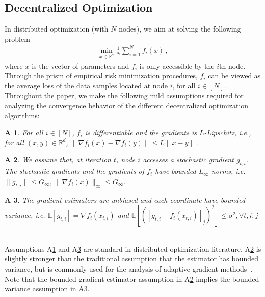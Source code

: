 \documentclass{article} %
\newtheorem{assumptionA}{A\!\!}
\begin{document}
\vspace{-0.05in}
\subsection{Decentralized Optimization }
\vspace{-0.05in}

In distributed optimization (with $N$ nodes), we aim at solving the following problem
\begin{align}\label{eq:minproblem}
\min_{x \in \mathbb{R}^d} \frac{1}{N}\sum_{i=1}^N f_i(x) \, ,
\end{align}
where $x$ is the vector of parameters and $f_i$ is only accessible by the $i$th node. 
Through the prism of empirical risk minimization procedures, $f_i$ can be viewed as the average loss of the data samples located at node $i$, for all $i \in [N]$. 
Throughout the paper, we make the following mild assumptions required for analyzing the convergence behavior of the different decentralized optimization algorithms:
\begin{assumptionA}\label{a:diff}
For all $i \in [N]$, $f_i$ is differentiable and the gradients is $L$-Lipschitz, i.e., for all $(x, y) \in \mathbb{R}^d$, $\|\nabla f_i(x) - \nabla f_i(y) \| \leq L\|x-y\|$.
\end{assumptionA}
\begin{assumptionA}\label{a:boundsto}
We assume that, at iteration $t$, node $i$ accesses a stochastic gradient $g_{t,i}$. The stochastic gradients and the gradients of $f_i$ have bounded $L_{\infty}$ norms, i.e. $\|g_{t,i}\| \leq G_{\infty}$, $\|\nabla f_i(x)\|_{\infty} \leq G_{\infty}$. 
\end{assumptionA}
\begin{assumptionA}\label{a:boundedvar}
The gradient estimators are unbiased and each coordinate have bounded variance, i.e. $\mathbb E [g_{t,i}] = \nabla f_i(x_{t,i}) $ and $\mathbb E [([g_{t,i} - f_i(x_{t,i})]_j)^2] \leq  \sigma^2, \forall t,i,j$ . 
\end{assumptionA}
Assumptions A\ref{a:diff} and A\ref{a:boundedvar} are standard in distributed optimization literature. A\ref{a:boundsto} is slightly stronger than the traditional assumption that the estimator has bounded variance, but is commonly used for the analysis of adaptive gradient methods~\citep{chen2018convergence,ward2018adagrad}. 
Note that the bounded gradient estimator assumption in A\ref{a:boundsto} implies the bounded variance assumption in A\ref{a:boundedvar}.
\end{document}
